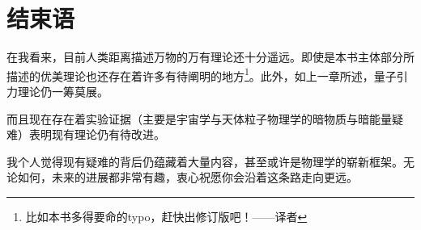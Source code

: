 

\chapter{结束语}
\label{chap13}
在我看来，目前人类距离描述万物的万有理论还十分遥远。即使是本书主体部分所描述的优美理论也还存在着许多有待阐明的地方\footnote{比如本书多得要命的typo，赶快出修订版吧！——译者}。此外，如上一章所述，量子引力理论仍一筹莫展。

而且现在存在着实验证据（主要是宇宙学与天体粒子物理学的暗物质与暗能量疑难）表明现有理论仍有待改进。

我个人觉得现有疑难的背后仍蕴藏着大量内容，甚至或许是物理学的崭新框架。无论如何，未来的进展都非常有趣，衷心祝愿你会沿着这条路走向更远。